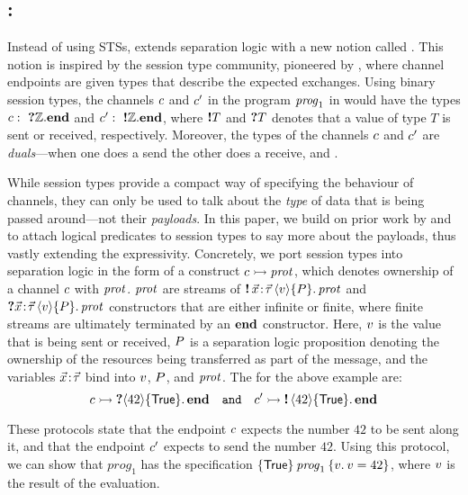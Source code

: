 \subsection{: \Pname}
\label{sec:intro_protocols}

Instead of using STSs, \lname extends
separation logic with a new notion called \emph{\pname}.
This notion is inspired by the session type community, pioneered by
\citet{honda-ESOP1998}, where channel endpoints are given types that describe
the expected exchanges.
Using binary session types, the channels $c$ and $c'$ in the program
${\it prog}_1$ in 
would have the types $c :\ \textnormal{\bf ?}{\mathbb{Z}}. \mathbf{end}$ and
$c':\ \textnormal{\bf !}{\mathbb{Z}}. \mathbf{end}$,
where $\textnormal{\bf !} T$ and $\textnormal{\bf ?} T$ denotes that a value of type $T$ is sent or
received, respectively.
Moreover, the types of the channels $c$ and $c'$ are \emph{duals}---when one does a send the other
does a receive, and \viceversa.

While session types provide a compact way of specifying the behaviour of channels,
they can only be used to talk
about the \emph{type} of data that is being passed around---not their \emph{payloads}.
In this paper, we build on prior work by \citet{bocchi-CONCUR2010} and
\citet{cracium-ICECCS2015} to attach logical predicates to session types to say more about the payloads, thus vastly extending the expressivity.
Concretely, we port session types into separation logic in the
form of a construct $c \rightarrowtail \mathit{prot}$, which denotes ownership of a channel
$c$ with \pnameSingular $\mathit{prot}$.
\Pname $\mathit{prot}$ are streams of
$\sendprot {\xdots} \val \iprop \prot$ and
$\recvprot {\xdots} \val \iprop \prot$ constructors that are either infinite or finite,
where finite streams are ultimately terminated by an $\mathbf{end}$ constructor.
Here, $v$ is the value that is
being sent or received, $P$ is a separation logic proposition denoting
the ownership of the resources being transferred as part of the message, and the variables $\vec{x}\!:\!\vec{\tau}$ bind into $v$, $P$, and $\mathit{prot}$.
The \pname for the above example are:
\[
\interp{\chan}{\recvprot {} {42} \TRUE \protend}
\quad\mathtt{and}\quad
\interp{\chan'}{\sendprot {} {42} \TRUE \protend}
\]

\noindent These protocols state that the endpoint $c$ expects the number $42$ to
be sent along it, and that the endpoint $c'$ expects to send the number
$42$.
Using this protocol, we can show that ${\mathit prog}_1$
has the specification
$\hoare \TRUE {\mathit {prog}_1} {\Ret \val. \val = 42}$, where $v$ is the result
of the evaluation.

